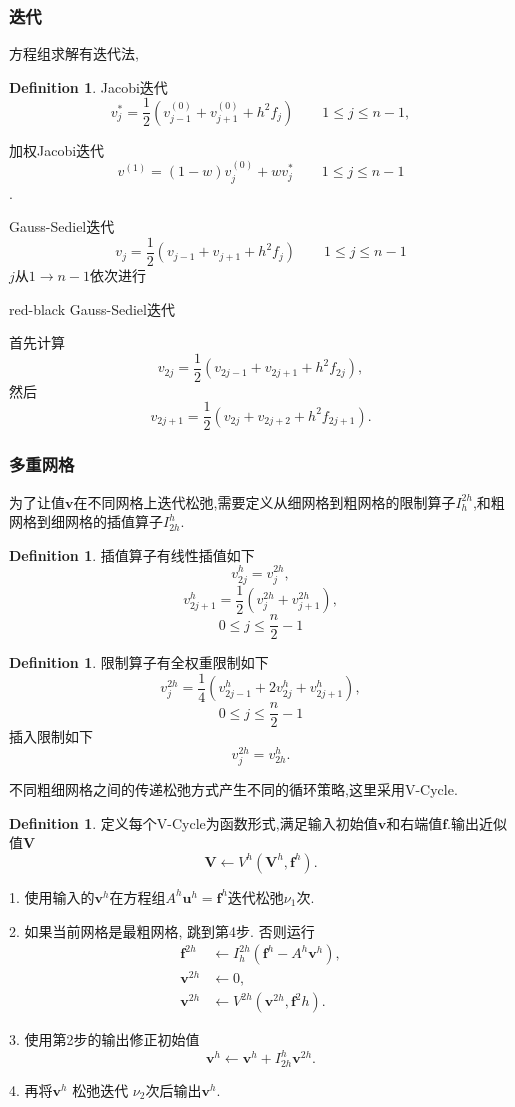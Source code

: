 \documentclass[a4paper]{book}
\numberwithin{equation}{chapter}
\theoremstyle{definition}
\newtheorem{defn}[thm]{Definition}
\begin{document}
\subsubsection{迭代}
方程组求解有迭代法,
\begin{defn}
	Jacobi迭代
	\[v_j^* = \frac{1}{2}(v_{j-1}^{(0)} + v_{j+1}^{(0)} + h^2 f_j) \qquad 1 \leq j \leq n-1,\]
	
	加权Jacobi迭代
	\[v^{(1)} = (1 - w)v_j^{(0)} + w v_j^*  \qquad 1 \leq j \leq n-1 \].
	
	Gauss-Sediel迭代
	\[v_j = \frac{1}{2}(v_{j-1} + v_{j+1} + h^2 f_j) \qquad 1 \leq j \leq n-1\]
	$j$从$1 \rightarrow n-1$依次进行
	
	red-black Gauss-Sediel迭代
	
	首先计算
	\[v_{2j} = \frac{1}{2}(v_{2j-1} + v_{2j+1} + h^2 f_{2j}),\]
	然后
	\[v_{2j+1} = \frac{1}{2}(v_{2j} + v_{2j+2} + h^2 f_{2j+1}).\]
\end{defn}

\subsubsection{多重网格}
为了让值$\mathbf{v}$在不同网格上迭代松弛,需要定义从细网格到粗网格的限制算子$I_h^{2h}$,和粗网格到细网格的插值算子$I_{2h}^h$.
\begin{defn}
	插值算子有线性插值如下
	\[v_{2j}^h = v_j^{2h}, \]
	\[v_{2j+1}^h = \frac{1}{2}(v_j^{2h} + v_{j+1}^{2h}),\]
	\[0 \leq j \leq \frac{n}{2} - 1\]
\end{defn}
\begin{defn}
	限制算子有全权重限制如下
\[v_j^{2h} = \frac{1}{4}(v_{2j-1}^h + 2 v_{2j}^h + v_{2j+1}^h),\]
	\[0 \leq j \leq \frac{n}{2} - 1\]
	插入限制如下
	\[v_j^{2h} = v_{2h}^h.\]
\end{defn}

不同粗细网格之间的传递松弛方式产生不同的循环策略,这里采用V-Cycle.

\begin{defn}
	定义每个V-Cycle为函数形式,满足输入初始值$\mathbf{v}$和右端值$\mathbf{f}$.输出近似值$\mathbf{V}$
	\[\mathbf{V} \leftarrow V^h(\mathbf{V}^h, \mathbf{f}^h). \]
	
	1. 使用输入的$\mathbf{v}^h$在方程组$A^h \mathbf{u}^h = \mathbf{f}^h$迭代松弛$\nu_1$次.
	
	
	2. 如果当前网格是最粗网格, 跳到第4步. 否则运行
	\begin{align*}
	\mathbf{f}^{2h} &\leftarrow I_h^{2h}(\mathbf{f}^h - A^h \mathbf{v}^h),\\
	\mathbf{v}^{2h} &\leftarrow 0, \\
	\mathbf{v}^{2h} &\leftarrow V^{2h}(\mathbf{v}^{2h}, \mathbf{f}^2h).
	\end{align*}
	
	3. 使用第2步的输出修正初始值
	\[\mathbf{v}^h \leftarrow \mathbf{v}^h + I_{2h}^{h} \mathbf{v}^{2h}.\]
	
	4. 再将$\mathbf{v}^h$ 松弛迭代 $\nu_2$次后输出$\mathbf{v}^h$.
	
	
\end{defn}
\end{document}
